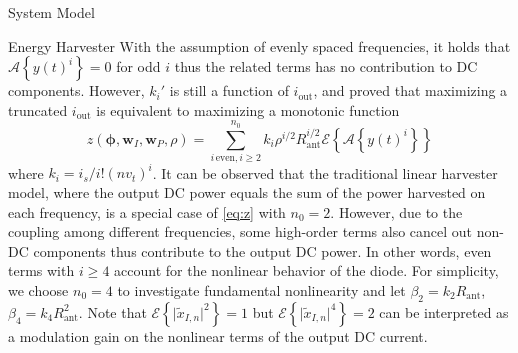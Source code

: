\documentclass[journal]{IEEEtran}
\begin{document}
\begin{section}{System Model}
\begin{subsection}{Energy Harvester}
		With the assumption of evenly spaced frequencies, it holds that $\mathcal{A}\left\{y(t)^i\right\}=0$ for odd $i$ thus the related terms has no contribution to DC components. However, $k_i'$ is still a function of $i_{\text{out}}$, and \cite{Clerckx2016a} proved that maximizing a truncated $i_{\text{out}}$ is equivalent to maximizing a monotonic function
		\begin{equation}\label{eq:z}
			z(\boldsymbol{\phi},\boldsymbol{w}_I,\boldsymbol{w}_P,\rho)=\sum_{i\,\text{even},i\ge2}^{n_0}{k_i}{\rho^{i/2}}{R_{\text{ant}}^{i/2}}{\mathcal{E}\left\{\mathcal{A}\left\{y(t)^i\right\}\right\}}
		\end{equation}
		where $k_i=i_s/i!(nv_t)^i$. It can be observed that the traditional linear harvester model, where the output DC power equals the sum of the power harvested on each frequency, is a special case of \ref{eq:z} with $n_0=2$. However, due to the coupling among different frequencies, some high-order terms also cancel out non-DC components thus contribute to the output DC power. In other words, even terms with $i \ge 4$ account for the nonlinear behavior of the diode. For simplicity, we choose $n_0=4$ to investigate fundamental nonlinearity and let $\beta_2={k_2}{R_{\text{ant}}}$, $\beta_4={k_4}{R_{\text{ant}}^2}$. Note that $\mathcal{E}\left\{\lvert\tilde{x}_{I,n}\rvert^2\right\}=1$ but $\mathcal{E}\left\{\lvert\tilde{x}_{I,n}\rvert^4\right\}=2$ can be interpreted as a modulation gain on the nonlinear terms of the output DC current.


\end{subsection}
\end{section}
\end{document}
